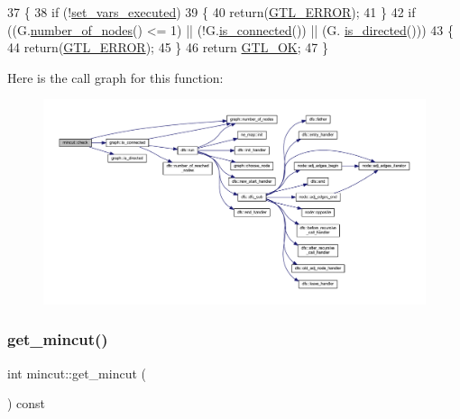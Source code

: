 \begin{DoxyCode}
37 \{
38     \textcolor{keywordflow}{if} (!\mbox{\hyperlink{classmincut_adeef2b186f863ce70809a6731f09de04}{set\_vars\_executed}})
39     \{
40         \textcolor{keywordflow}{return}(\mbox{\hyperlink{classalgorithm_af1a0078e153aa99c24f9bdf0d97f6710a6fcf574690bbd6cf710837a169510dd7}{GTL\_ERROR}});
41     \}
42     \textcolor{keywordflow}{if} ((G.\mbox{\hyperlink{classgraph_a42c78e0a9f115655e3ff0efe35ebfc4e}{number\_of\_nodes}}() <= 1) || (!G.\mbox{\hyperlink{classgraph_a599e2bf967df8a2052a9892c94db98b7}{is\_connected}}()) || (G.
      \mbox{\hyperlink{classgraph_afc510be7479fa903fde9e0e615470ab0}{is\_directed}}()))
43     \{
44         \textcolor{keywordflow}{return}(\mbox{\hyperlink{classalgorithm_af1a0078e153aa99c24f9bdf0d97f6710a6fcf574690bbd6cf710837a169510dd7}{GTL\_ERROR}});
45     \}
46     \textcolor{keywordflow}{return} \mbox{\hyperlink{classalgorithm_af1a0078e153aa99c24f9bdf0d97f6710a5114c20e4a96a76b5de9f28bf15e282b}{GTL\_OK}};
47 \}
\end{DoxyCode}
Here is the call graph for this function\+:\nopagebreak
\begin{figure}[H]
\begin{center}
\leavevmode
\includegraphics[width=350pt]{classmincut_a3a06737106ab6000360a1f799361691a_cgraph}
\end{center}
\end{figure}
\mbox{\label{classmincut_a7d61e51d9bcbfc620d88051250acbd77}} 
\subsubsection{\texorpdfstring{get\+\_\+mincut()}{get\_mincut()}}
{\footnotesize\ttfamily int mincut\+::get\+\_\+mincut (\begin{DoxyParamCaption}{ }\end{DoxyParamCaption}) const\hspace{0.3cm}{\ttfamily [inline]}}

